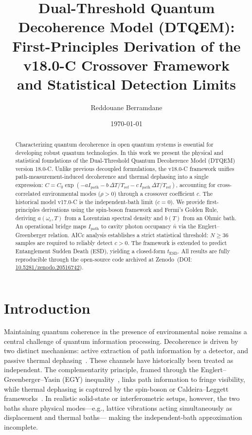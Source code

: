 \documentclass[reprint,amsmath,amssymb,aps,pra,superscriptaddress]{revtex4-2}
\begin{document}
\title{Dual-Threshold Quantum Decoherence Model (DTQEM):\\
       First-Principles Derivation of the v18.0-C Crossover Framework\\
       and Statistical Detection Limits}
\author{Reddouane Berramdane}
\date{\today}

\begin{abstract}
Characterizing quantum decoherence in open quantum systems is essential for
developing robust quantum technologies. In this work we present the physical
and statistical foundations of the Dual-Threshold Quantum Decoherence Model
(DTQEM) version 18.0-C. Unlike previous decoupled formulations, the v18.0-C
framework unifies path-measurement-induced decoherence and thermal dephasing
into a single expression:
$C = C_0\exp(-a I_{\text{path}} - b\,\Delta T/T_{\text{ref}}
              - c\,I_{\text{path}}\,\Delta T/T_{\text{ref}})$,
accounting for cross-correlated environmental modes ($\rho>0$) through a
crossover coefficient $c$. The historical model v17.0-C is the
independent-bath limit ($c=0$). We provide first-principles derivations using
the spin-boson framework and Fermi's Golden Rule, deriving $a(\omega_c,T)$
from a Lorentzian spectral density and $b(T)$ from an Ohmic bath. An
operational bridge maps $I_{\text{path}}$ to cavity photon occupancy $\bar n$
via the Englert--Greenberger relation. AICc analysis establishes a strict
statistical threshold: $N\ge36$ samples are required to reliably detect
$c>0$. The framework is extended to predict Entanglement Sudden Death (ESD),
yielding a closed-form $t_{\text{ESD}}$. All results are fully reproducible
through the open-source code archived at
Zenodo~(DOI:\,\href{https://doi.org/10.5281/zenodo.20516742}{10.5281/zenodo.20516742}).
\end{abstract}
\maketitle

\section{Introduction}
Maintaining quantum coherence in the presence of environmental noise remains
a central challenge of quantum information processing. Decoherence is driven
by two distinct mechanisms: active extraction of path information by a
detector, and passive thermal dephasing~\cite{breuer2002}. These channels
have historically been treated as independent. The complementarity principle,
framed through the Englert--Greenberger--Yasin (EGY)
inequality~\cite{englert1996}, links path information to fringe visibility,
while thermal dephasing is captured by the spin-boson or Caldeira--Leggett
frameworks~\cite{weiss2012}. In realistic solid-state or
interferometric setups, however, the two baths share physical modes---e.g.,
lattice vibrations acting simultaneously as displacement and thermal baths---
making the independent-bath approximation incomplete.
\end{document}
